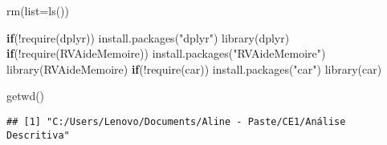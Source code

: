 \documentclass[
]{article}
\newenvironment{Shaded}{\begin{snugshade}}{\end{snugshade}}
\newcommand{\AttributeTok}[1]{\textcolor[rgb]{0.77,0.63,0.00}{#1}}
\newcommand{\ControlFlowTok}[1]{\textcolor[rgb]{0.13,0.29,0.53}{\textbf{#1}}}
\newcommand{\DecValTok}[1]{\textcolor[rgb]{0.00,0.00,0.81}{#1}}
\newcommand{\FunctionTok}[1]{\textcolor[rgb]{0.00,0.00,0.00}{#1}}
\newcommand{\NormalTok}[1]{#1}
\newcommand{\OtherTok}[1]{\textcolor[rgb]{0.56,0.35,0.01}{#1}}
\newcommand{\SpecialCharTok}[1]{\textcolor[rgb]{0.00,0.00,0.00}{#1}}
\newcommand{\StringTok}[1]{\textcolor[rgb]{0.31,0.60,0.02}{#1}}
\begin{document}
\begin{Shaded}
\begin{Highlighting}[]
\FunctionTok{rm}\NormalTok{(}\AttributeTok{list=}\FunctionTok{ls}\NormalTok{())}

\ControlFlowTok{if}\NormalTok{(}\SpecialCharTok{!}\FunctionTok{require}\NormalTok{(dplyr)) }\FunctionTok{install.packages}\NormalTok{(}\StringTok{"dplyr"}\NormalTok{) }
\FunctionTok{library}\NormalTok{(dplyr)                                }
\ControlFlowTok{if}\NormalTok{(}\SpecialCharTok{!}\FunctionTok{require}\NormalTok{(RVAideMemoire)) }\FunctionTok{install.packages}\NormalTok{(}\StringTok{"RVAideMemoire"}\NormalTok{) }
\FunctionTok{library}\NormalTok{(RVAideMemoire)                                        }
\ControlFlowTok{if}\NormalTok{(}\SpecialCharTok{!}\FunctionTok{require}\NormalTok{(car)) }\FunctionTok{install.packages}\NormalTok{(}\StringTok{"car"}\NormalTok{) }
\FunctionTok{library}\NormalTok{(car)                                }

\FunctionTok{getwd}\NormalTok{() }
\end{Highlighting}
\end{Shaded}

\begin{verbatim}
## [1] "C:/Users/Lenovo/Documents/Aline - Paste/CE1/Análise Descritiva"
\end{verbatim}

\begin{Shaded}
\end{Shaded}
\end{document}
